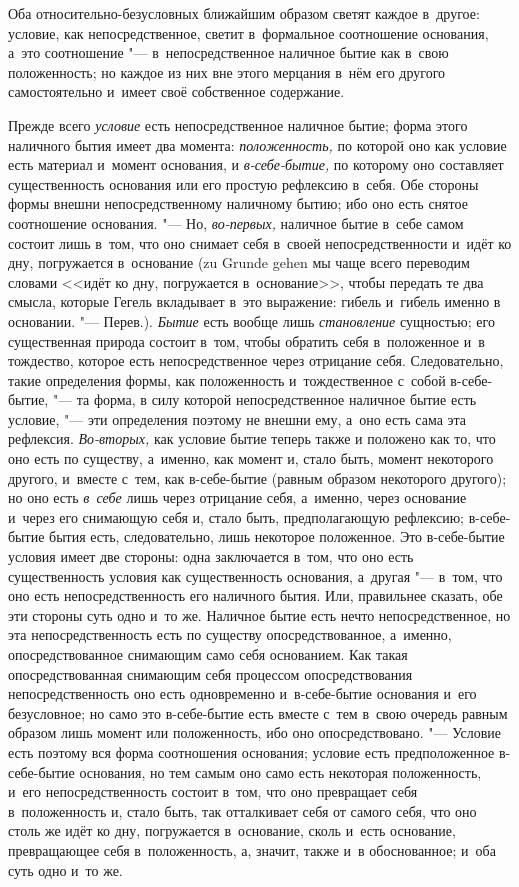 
Оба относительно-безусловных ближайшим образом
светят каждое в~другое: условие, как непосредственное, светит в~формальное
соотношение основания, а~это соотношение "--- в~непосредственное наличное
бытие как в~свою положенность; но каждое из них вне этого мерцания в~нём
его другого самостоятельно и~имеет своё собственное содержание.

Прежде всего {\em условие} есть непосредственное
наличное бытие; форма этого наличного бытия имеет два момента:
{\em положенность,} по которой оно как условие есть
материал и~момент основания, и {\em в-себе-бытие,} по
которому оно составляет существенность основания или его простую рефлексию
в~себя. Обе стороны формы внешни непосредственному наличному бытию; ибо оно
есть снятое соотношение основания. "--- Но,
{\em во-первых,} наличное бытие в~себе самом состоит
лишь в~том, что оно снимает себя в~своей непосредственности и~идёт ко дну,
погружается в~основание (zu Grunde gehen мы чаще всего переводим словами
<<идёт ко дну, погружается в~основание>>, чтобы передать те два смысла,
которые Гегель вкладывает в~это выражение: гибель и~гибель именно в
основании. "--- Перев.). {\em Бытие} есть вообще лишь
{\em становление} сущностью; его существенная природа
состоит в~том, чтобы обратить себя в~положенное и~в тождество, которое есть
непосредственное через отрицание себя. Следовательно, такие определения
формы, как положенность и~тождественное с~собой в-себе-бытие, "--- та форма, в
силу которой непосредственное наличное бытие есть условие, "--- эти
определения поэтому не внешни ему, а~оно есть сама эта рефлексия.
{\em Во-вторых,} как условие бытие теперь также и
положено как то, что оно есть по существу, а~именно, как момент и, стало
быть, момент некоторого другого, и~вместе с~тем, как в-себе-бытие (равным
образом некоторого другого); но оно есть {\em в~себе}
лишь через отрицание себя, а~именно, через основание и~через его снимающую
себя и, стало быть, предполагающую рефлексию; в-себе-бытие бытия есть,
следовательно, лишь некоторое положенное. Это в-себе-бытие условия имеет
две стороны: одна заключается в~том, что оно есть существенность условия
как существенность основания, а~другая "--- в~том, что оно есть
непосредственность его наличного бытия. Или, правильнее сказать, обе эти
стороны суть одно и~то же. Наличное бытие есть нечто непосредственное, но
эта непосредственность есть по существу опосредствованное, а~именно,
опосредствованное снимающим само себя основанием. Как такая
опосредствованная снимающим себя процессом опосредствования
непосредственность оно есть одновременно и~в-себе-бытие основания и~его
безусловное; но само это в-себе-бытие есть вместе с~тем в~свою очередь
равным образом лишь момент или положенность, ибо оно опосредствовано. "---
Условие есть поэтому вся форма соотношения основания; условие есть
предположенное в-себе-бытие основания, но тем самым оно само есть некоторая
положенность, и~его непосредственность состоит в~том, что оно превращает
себя в~положенность и, стало быть, так отталкивает себя от самого себя, что
оно столь же идёт ко дну, погружается в~основание, сколь и~есть основание,
превращающее себя в~положенность, а, значит, также и~в обоснованное; и~оба
суть одно и~то же.


